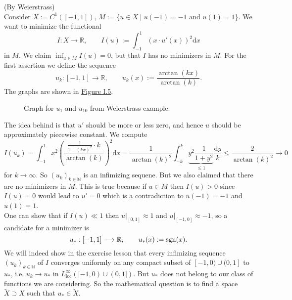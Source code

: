 \begin{example}
(By Weierstrass)\\
Consider $X:=C^1([-1,1])$, $M:=\{u\in X\mid u(-1)=-1\text{ and }u(1)=1\}$. We want to minimize the functional
\[I:X\longrightarrow\mathbb{R},\qquad I(u):=\int_{-1}^1{(x\cdot u'(x))^2\mathrm{d}x}\]
in $M$. We claim $\inf_{u\in M}{I(u)}=0$, but that $I$ has no minimizers in $M$. For the first assertion we define the sequence
\[u_k:[-1,1]\longrightarrow\mathbb{R},\qquad u_k(x):=\frac{\arctan(kx)}{\arctan(k)}.\]
The graphs are shown in \hyperref[fig:example_1_3_1]{Figure I.5}.

\begin{figure}[h]
	\centering
	\caption{Graph for $u_1$ and $u_{10}$ from Weierstrass example.}
	\label{fig:example_1_3_1}
\end{figure}

The idea behind is that $u'$ should be more or less zero, and hence $u$ should be approximately piecewise constant. We compute
\[I(u_k)=\int_{-1}^1{x^2\left(\frac{\frac{1}{1+(kx)^2}\cdot k}{\arctan(k)}\right)^2\mathrm{d}x}=\frac{1}{\arctan(k)^2}\int_{-k}^k{\underbrace{y^2\frac{1}{1+y^2}}_{\leq1}\frac{\mathrm{d}y}{k}}\leq\frac{2}{\arctan(k)^2}\to0\]
for $k\to\infty$. So $(u_k)_{k\in\mathbb{N}}$ is an infimizing sequene. But we also claimed that there are no minimizers in $M$. This is true because if $u\in M$ then $I(u)>0$ since $I(u)=0$ would lead to $u'=0$ which is a contradiction to $u(-1)=-1$ and $u(1)=1$.\\

One can show that if $I(u)\ll1$ then $u|_{[0,1]}\approx1$ and $u|_{[-1,0]}\approx-1$, so a candidate for a minimizer is
\[u_*:[-1,1]\longrightarrow\mathbb{R},\qquad u_*(x):=\operatorname{sgn}\mathopen{}\left(x\right)\mathclose{}.\]
We will indeed show in the exercise lesson that every infimizing sequence $(u_k)_{k\in\mathbb{N}}$ of $I$ converges uniformly on any compact subset of $[-1,0)\cup(0,1]$ to $u_*$, i.e. $u_k\to u_*$ in $L_\text{loc}^\infty([-1,0)\cup(0,1])$. But $u_*$ does not belong to our class of functions we are considering. So the mathematical question is to find a space $\widetilde{X}\supset X$ such that $u_*\in\widetilde{X}$.
\end{example}

